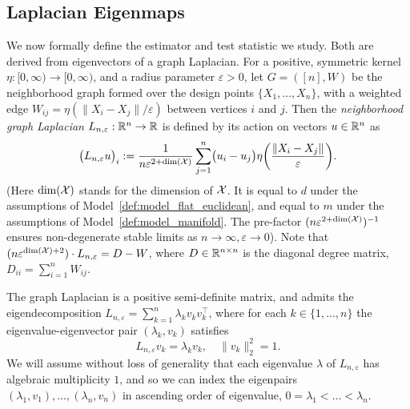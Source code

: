 \subsection{Laplacian Eigenmaps}
\label{subsec:laplacian_eigenmaps}
We now formally define the estimator and test statistic we study. Both are derived from eigenvectors of a graph Laplacian.  For a positive, symmetric kernel $\eta: [0,\infty) \to [0,\infty)$, and a radius parameter $\varepsilon > 0$, let $G = ([n],W)$ be the neighborhood graph formed over the design points $\{X_1,\ldots,X_n\}$, with a weighted edge $W_{ij} = \eta(\|X_i - X_j\|/\varepsilon)$ between vertices $i$ and $j$. Then the 
\emph{neighborhood graph Laplacian} $L_{n,\varepsilon}: \mathbb{R}^n \to \mathbb{R}$ is defined by its action on vectors $u \in \mathbb{R}^n$ as
\begin{equation}
\label{eqn:neighborhood_graph_laplacian}
\bigl(L_{n,\varepsilon}u\bigr)_i := \frac{1}{n\varepsilon^{2 + \mathrm{dim}(\mathcal{X})}} \sum_{j = 1}^{n} \bigl(u_i - u_j\bigr) \eta\biggl(\frac{\|X_i - X_j\|}{\varepsilon}\biggr).
\end{equation}
(Here $\mathrm{dim}(\mathcal{X})$ stands for the dimension of $\mathcal{X}$. It is equal to $d$ under the assumptions of Model~\ref{def:model_flat_euclidean}, and equal to $m$ under the assumptions of Model~\ref{def:model_manifold}. The pre-factor $(n\varepsilon^{2 + \mathrm{dim}(\mathcal{X})})^{-1}$ ensures non-degenerate stable limits as $n \to \infty, \varepsilon \to 0$). Note that $(n\varepsilon^{\dim(\mathcal{X}) + 2}) \cdot L_{n,\varepsilon} = D - W$, where $D \in \mathbb{R}^{n \times n}$ is the diagonal degree matrix, $D_{ii} = \sum_{i = 1}^{n} W_{ij}$.

The graph Laplacian is a positive semi-definite matrix, and admits the eigendecomposition $L_{n,\varepsilon} = \sum_{k = 1}^{n} \lambda_k v_k v_k^{\top}$, where for each $k \in \{1,\ldots,n\}$ the eigenvalue-eigenvector pair $(\lambda_k,v_k)$ satisfies
\begin{equation*}
L_{n,\varepsilon}v_k = \lambda_k v_k, \quad \|v_k\|_2^2 = 1.
\end{equation*}
We will assume without loss of generality that each eigenvalue $\lambda$ of $L_{n,\varepsilon}$ has algebraic multiplicity $1$, and so we can index the eigenpairs $(\lambda_1,v_1),\ldots,(\lambda_n,v_n)$ in ascending order of eigenvalue, $0 = \lambda_1 < \ldots < \lambda_n$. 

